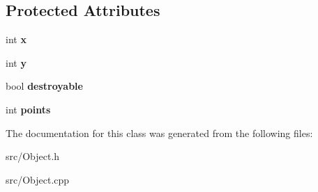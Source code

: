 \subsection*{Protected Attributes}
\begin{DoxyCompactItemize}
\item 
\mbox{\label{class_object_aea8b4e1f4895ce5a0be5dbf42864669c}} 
int {\bfseries x}
\item 
\mbox{\label{class_object_a9ed372592e77352c832d721ad88b9aec}} 
int {\bfseries y}
\item 
\mbox{\label{class_object_a6c12693bbb9a59f9bfe61a23859cf8e1}} 
bool {\bfseries destroyable}
\item 
\mbox{\label{class_object_a49c53344b8a2b0a9e8ed66aae564861f}} 
int {\bfseries points}
\end{DoxyCompactItemize}


The documentation for this class was generated from the following files\+:\begin{DoxyCompactItemize}
\item 
src/Object.\+h\item 
src/Object.\+cpp\end{DoxyCompactItemize}
